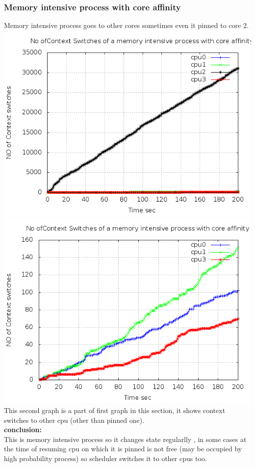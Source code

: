\documentclass[a4paper,11pt]{report}
\begin{document}
 \subsubsection{Memory intensive process with core affinity}
 Memory intensive process goes to other cores sometimes even it pinned to core 2.\\
 \includegraphics[scale=0.5]{memlast.png}\\
 \includegraphics[scale=0.5]{memlast2.png}\\
 This second graph is a part of first graph in this section, it shows context switches to other cpu (other than pinned one). 
\\{\bf conclusion:} \\This is memory intensive process so it changes state regularlly , in some cases at the time of resuming cpu on which it is pinned is not free (may be occupied by high probability process) so scheduler switches it to other cpus too.   
\end{document}
